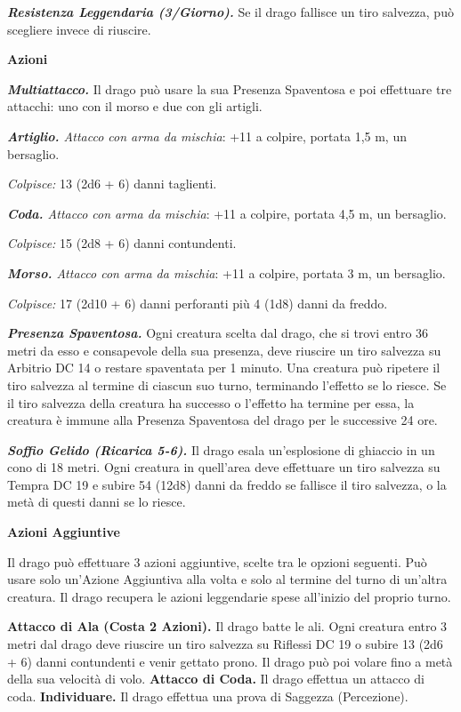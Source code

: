 \begin{multicols}{2}
\emph{\textbf{Resistenza Leggendaria (3/Giorno).}} Se il drago fallisce
un tiro salvezza, può scegliere invece di riuscire.

\textbf{Azioni}

\emph{\textbf{Multiattacco.}} Il drago può usare la sua Presenza
Spaventosa e poi effettuare tre attacchi: uno con il morso e due con gli
artigli.

\emph{\textbf{Artiglio.} Attacco con arma da mischia}: +11 a colpire,
portata 1,5 m, un bersaglio.

\emph{Colpisce:} 13 (2d6 + 6) danni taglienti.

\emph{\textbf{Coda.} Attacco con arma da mischia}: +11 a colpire,
portata 4,5 m, un bersaglio.

\emph{Colpisce:} 15 (2d8 + 6) danni contundenti.

\emph{\textbf{Morso.} Attacco con arma da mischia}: +11 a colpire,
portata 3 m, un bersaglio.

\emph{Colpisce:} 17 (2d10 + 6) danni perforanti più 4 (1d8) danni da
freddo.

\emph{\textbf{Presenza Spaventosa.}} Ogni creatura scelta dal drago, che
si trovi entro 36 metri da esso e consapevole della sua presenza, deve
riuscire un tiro salvezza su Arbitrio DC 14 o restare spaventata per 1
minuto. Una creatura può ripetere il tiro salvezza al termine di ciascun
suo turno, terminando l'effetto se lo riesce. Se il tiro salvezza della
creatura ha successo o l'effetto ha termine per essa, la creatura è
immune alla Presenza Spaventosa del drago per le successive 24 ore.

\emph{\textbf{Soffio Gelido (Ricarica 5-6).}} Il drago esala
un'esplosione di ghiaccio in un cono di 18 metri. Ogni creatura in
quell'area deve effettuare un tiro salvezza su Tempra DC 19 e
subire 54 (12d8) danni da freddo se fallisce il tiro salvezza, o la metà
di questi danni se lo riesce.

\textbf{Azioni Aggiuntive}

Il drago può effettuare 3 azioni aggiuntive, scelte tra le opzioni
seguenti. Può usare solo un'Azione Aggiuntiva alla volta e solo al
termine del turno di un'altra creatura. Il drago recupera le azioni
leggendarie spese all'inizio del proprio turno.

\textbf{Attacco di Ala (Costa 2 Azioni).} Il drago batte le ali. Ogni
creatura entro 3 metri dal drago deve riuscire un tiro salvezza su Riflessi DC 19 o subire 13 (2d6 + 6) danni contundenti e venir gettato
prono. Il drago può poi volare fino a metà della sua velocità di volo.
\textbf{Attacco di Coda.} Il drago effettua un attacco di coda.
\textbf{Individuare.} Il drago effettua una prova di Saggezza
(Percezione).


\end{multicols}
